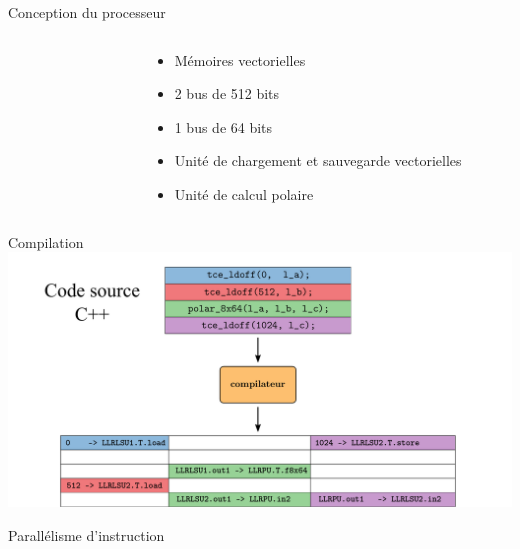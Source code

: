 \begin{frame}[c]{Conception du processeur}
  \begin{columns}[T] %
    \begin{column}{.48\textwidth}
      \vspace{-0.5cm}
    \end{column}
    \begin{column}{.07\textwidth}
    \end{column}
    \begin{column}{.41\textwidth}
      \begin{itemize}
        \item<1-> Mémoires vectorielles
        \vspace{0.2cm}
        \item<2-> 2 bus de 512 bits
        \vspace{0.2cm}
        \item<2-> 1 bus de 64 bits
        \vspace{0.2cm}
        \item<3-> Unité de chargement et sauvegarde vectorielles
        \vspace{0.2cm}
        \item<4-> Unité de calcul polaire
      \end{itemize}
    \end{column}
  \end{columns} %
\end{frame}

\begin{frame}[c]{Compilation}
  \includegraphics[width=\textwidth]{fig/compilation}
\end{frame}

\begin{frame}[c]{Parallélisme d'instruction}
\end{frame}





